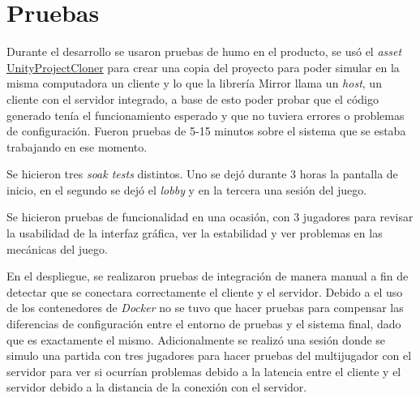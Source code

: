 \section{Pruebas}
Durante el desarrollo se usaron pruebas de humo en el producto, se usó el \textit{asset} \href{https://github.com/hwaet/UnityProjectCloner}{UnityProjectCloner} para crear una copia del proyecto para poder simular en la misma computadora un cliente y lo que la librería Mirror llama un \textit{host}, un cliente con el servidor integrado, a base de esto poder probar que el código generado tenía el funcionamiento esperado y que no tuviera errores o problemas de configuración. Fueron pruebas de 5-15 minutos sobre el sistema que se estaba trabajando en ese momento.

Se hicieron tres \textit{soak tests} distintos. Uno se dejó durante 3 horas la pantalla de inicio, en el segundo se dejó el \textit{lobby} y en la tercera una sesión del juego.

Se hicieron pruebas de funcionalidad en una ocasión, con 3 jugadores para revisar la usabilidad de la interfaz gráfica, ver la estabilidad y ver problemas en las mecánicas del juego.

En el despliegue, se realizaron pruebas de integración de manera manual a fin de detectar que se conectara correctamente el cliente y el servidor. Debido a el uso de los contenedores de \textit{Docker} no se tuvo que hacer pruebas para compensar las diferencias de configuración entre el entorno de pruebas y el sistema final, dado que es exactamente el mismo. Adicionalmente se realizó una sesión donde se simulo una partida con tres jugadores para hacer pruebas del multijugador con el servidor para ver si ocurrían problemas debido a la latencia entre el cliente y el servidor debido a la distancia de la conexión con el servidor.
